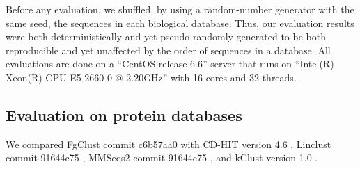 \documentclass[11pt,letterpaper]{article}
\begin{document}
Before any evaluation, we shuffled, by using a random-number generator with the same seed, the sequences in each biological database.
Thus, our evaluation results were both deterministically and yet pseudo-randomly generated to be both reproducible and yet unaffected by the order of sequences in a database.
All evaluations are done on a ``CentOS release 6.6'' server that runs on ``Intel(R) Xeon(R) CPU E5-2660 0 @ 2.20GHz'' with 16 cores and 32 threads.

\subsection{Evaluation on protein databases}

We compared FgClust commit c6b57aa0 with CD-HIT version 4.6 \citep{fu2012cd}, Linclust commit 91644c75 \citep{steinegger2017linclust}, MMSeqs2 commit 91644c75 \citep{steinegger2017mmseqs2}, and kClust version 1.0 \citep{hauser2013kclust}.
\end{document}

